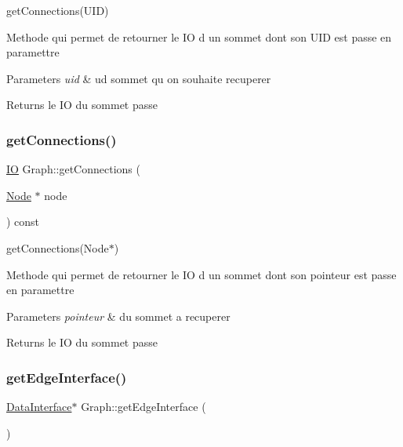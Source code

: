 get\+Connections(\+U\+I\+D) 

Methode qui permet de retourner le IO d un sommet dont son U\+ID est passe en paramettre


\begin{DoxyParams}{Parameters}
{\em uid} & ud sommet qu on souhaite recuperer \\
\hline
\end{DoxyParams}
\begin{DoxyReturn}{Returns}
le IO du sommet passe 
\end{DoxyReturn}
\mbox{\label{class_graph_ac925af39108ceec409a3083bc784604e}} 
\subsubsection{\texorpdfstring{get\+Connections()}{getConnections()}\hspace{0.1cm}{\footnotesize\ttfamily [2/2]}}
{\footnotesize\ttfamily \mbox{\hyperlink{_graph_8h_a383232190011cffd7d1fb05d72e89928}{IO}} Graph\+::get\+Connections (\begin{DoxyParamCaption}\item[{\mbox{\hyperlink{class_node}{Node}} $\ast$}]{node }\end{DoxyParamCaption}) const}



get\+Connections(\+Node$\ast$) 

Methode qui permet de retourner le IO d un sommet dont son pointeur est passe en paramettre


\begin{DoxyParams}{Parameters}
{\em pointeur} & du sommet a recuperer \\
\hline
\end{DoxyParams}
\begin{DoxyReturn}{Returns}
le IO du sommet passe 
\end{DoxyReturn}
\mbox{\label{class_graph_acd9d49e6e5767accd435a6446879e49b}} 
\subsubsection{\texorpdfstring{get\+Edge\+Interface()}{getEdgeInterface()}}
{\footnotesize\ttfamily \mbox{\hyperlink{struct_data_interface}{Data\+Interface}}$\ast$ Graph\+::get\+Edge\+Interface (\begin{DoxyParamCaption}{ }\end{DoxyParamCaption})}



